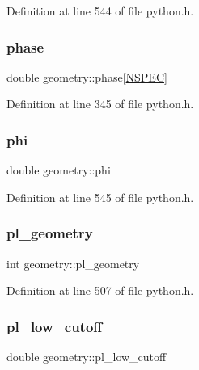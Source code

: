 Definition at line 544 of file python.\+h.

\mbox{\label{structgeometry_afbde871884638b579979cc55b7e7871d}} 
\subsubsection{\texorpdfstring{phase}{phase}}
{\footnotesize\ttfamily double geometry\+::phase\mbox{[}\hyperlink{python_8h_ade1df1cb82ae4ef9a5c0cddb37d9a73b}{N\+S\+P\+EC}\mbox{]}}



Definition at line 345 of file python.\+h.

\mbox{\label{structgeometry_a7e45dbb08be20ce886cf47b04efd9a5f}} 
\subsubsection{\texorpdfstring{phi}{phi}}
{\footnotesize\ttfamily double geometry\+::phi}



Definition at line 545 of file python.\+h.

\mbox{\label{structgeometry_a042bb87d1eecaa02b96251a50ce27c5a}} 
\subsubsection{\texorpdfstring{pl\+\_\+geometry}{pl\_geometry}}
{\footnotesize\ttfamily int geometry\+::pl\+\_\+geometry}



Definition at line 507 of file python.\+h.

\mbox{\label{structgeometry_a1b4000013a0814d5447eb7a3255a1fc5}} 
\subsubsection{\texorpdfstring{pl\+\_\+low\+\_\+cutoff}{pl\_low\_cutoff}}
{\footnotesize\ttfamily double geometry\+::pl\+\_\+low\+\_\+cutoff}



